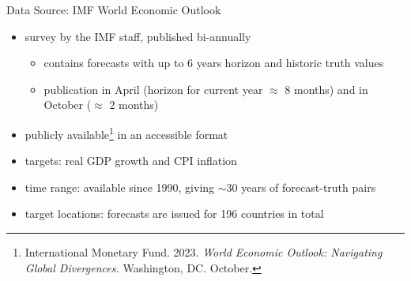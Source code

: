 \documentclass[en]{sdqbeamer}
\begin{document}
\begin{frame}{Data Source: IMF World Economic Outlook}
	\begin{itemize}
		\item survey by the IMF staff, published bi-annually
		\begin{itemize}
            \item contains forecasts with up to 6 years horizon and historic truth values
		    \item publication in April (horizon for current year $\approx$ 8 months) and in October ($\approx$ 2 months)
		\end{itemize}
    \item publicly available\footnote{International Monetary Fund. 2023. \textit{World Economic Outlook: Navigating Global Divergences.} Washington, DC. October.} in an accessible format
    \item targets: real GDP growth and CPI inflation 
    \item time range: available since 1990, giving $\sim$30 years of forecast-truth pairs %
    \item target locations: forecasts are issued for 196 countries in total
	\end{itemize}
\end{frame}
\end{document}
